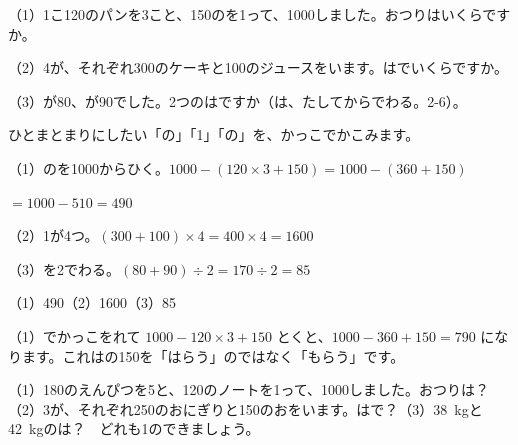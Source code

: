 \begin{reidai}
（1）1こ120のパンを3こと、150のを1って、1000しました。おつりはいくらですか。\par
（2）4が、それぞれ300のケーキと100のジュースをいます。はでいくらですか。\par
（3）が80、が90でした。2つのはですか（は、たしてからでわる。2-6）。\par
\kangaekata ひとまとまりにしたい「の」「1」「の」を、かっこでかこみます。\par
\shiki（1）のを1000からひく。$1000-(120\times3+150)=1000-(360+150)$\par
\hspace*{4.6\zw}$=1000-510=490$\par
\hspace*{2.6\zw}（2）1が4つ。$(300+100)\times4=400\times4=1600$\par
\hspace*{2.6\zw}（3）を2でわる。$(80+90)\div2=170\div2=85$\par
\kotae（1）490\quad（2）1600\quad（3）85
\end{reidai}

\noindent（1）でかっこをれて $1000-120\times3+150$ とくと、$1000-360+150=790$ になります。これはの150を「はらう」のではなく「もらう」です。

\begin{jibun}
（1）180のえんぴつを5と、120のノートを1って、1000しました。おつりは？\quad（2）3が、それぞれ250のおにぎりと150のおをいます。はで？\quad（3）\qty{38}{kg}と\qty{42}{kg}のは？　どれも1のできましょう。
\end{jibun}

